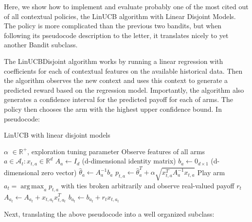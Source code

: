 \documentclass{jss}\usepackage[]{graphicx}\usepackage[]{color}
\DeclareMathOperator*{\argmax}{arg\,max}
\begin{document}
Here, we show how to implement and evaluate probably one of the most cited out of all contextual policies, the LinUCB algorithm with Linear Disjoint Models. The policy is more complicated than the previous two bandits, but when following its pseudocode description to the letter, it translates nicely to yet another Bandit subclass.

The LinUCBDisjoint algorithm works by running a linear regression with coefficients for each of  contextual features on the available historical data. Then the algorithm observes the new context and uses this context to generate a predicted reward based on the regression model. Importantly, the algorithm also generates a confidence interval for the predicted payoff for each of  arms. The policy then chooses the arm with the highest upper confidence bound. In pseudocode:

\begin{algorithm}[H]
\caption{LinUCB with linear disjoint models}
\label{Alg:LinUCBDisjoint}
\begin{algorithmic}
\REQUIRE $\alpha$ \(  \in \mathbb{R}^{+} \), exploration tuning parameter
          \STATE Observe features of all arms \(  a \in \mathcal{A}_{t}: x_{t,a} \in \mathbb{R}^{d}\)
		      \STATE \(A_{a} \leftarrow I_{d}  \)  (d-dimensional identity matrix)
		      \STATE \(b_{a} \leftarrow 0_{d\times1}   \) (d-dimensional zero vector)
		\ENDIF
		\STATE \( \hat{\theta}_{a} \leftarrow A_{a}^{-1}b_{a} \)
		\STATE \( p_{t,a} \leftarrow \hat{\theta}_{a}^{T} + \alpha  \sqrt{ x_{t,a}^{T} A_{a}^{-1}x_{t,a}} \)
	\ENDFOR
	\STATE Play arm \(a_t = \argmax_a  p_{t,a}  \) with ties broken arbitrarily and observe real-valued payoff $r_t$
           \STATE \( A_{a_{t}} \leftarrow A_{a_{t}}+ x_{t,a_{t}}x_{t,a_{t}}^{T} \)
           \STATE  \( b_{a_{t}} \leftarrow b_{a_{t}}+ r_{t}x_{t,a_{t}}  \)
\ENDFOR
\end{algorithmic}
\end{algorithm}

Next, translating the above pseudocode into a well organized  subclass:
\end{document}

